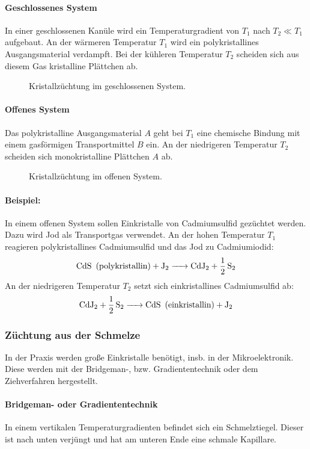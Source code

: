 \paragraph{Geschlossenes System}
    In einer geschlossenen Kanüle wird ein Temperaturgradient von $T_1$ nach $T_2 \ll T_1$ aufgebaut.
    An der wärmeren Temperatur $T_1$ wird ein polykristallines Ausgangsmaterial verdampft.
    Bei der kühleren Temperatur $T_2$ scheiden sich aus diesem Gas kristalline Plättchen ab.
    \begin{figure}[H]
        \centering
        \caption{Kristallzüchtung im geschlossenen System.}
        \label{fig:vl18-abbildung-4}
    \end{figure}

\paragraph{Offenes System}
    Das polykristalline Ausgangsmaterial $A$ geht bei $T_1$ eine chemische Bindung mit einem gasförmigen Transportmittel $B$ ein. 
    An der niedrigeren Temperatur $T_2$ scheiden sich monokristalline Plättchen $A$ ab.
    \begin{figure}[H]
        \centering
        \caption{Kristallzüchtung im offenen System.}
        \label{fig:vl18-abbildung-5}
    \end{figure}
\paragraph{Beispiel:} In einem offenen System sollen Einkristalle von Cadmiumsulfid  gezüchtet werden.
    Dazu wird Jod  als Transportgas verwendet.
    An der hohen Temperatur $T_1$ reagieren polykristallines Cadmiumsulfid und das Jod zu Cadmiumiodid:
    $$
        \ce{CdS \text{ (polykristallin)} + J2 -> CdJ2 + \frac{1}{2} S2}
    $$
    An der niedrigeren Temperatur $T_2$ setzt sich einkristallines Cadmiumsulfid ab:
    $$ 
        \ce{CdJ2 + \frac{1}{2} S2 -> CdS \text{ (einkristallin)} + J2}
    $$ 

\subsubsection{Züchtung aus der Schmelze}
    In der Praxis werden große Einkristalle benötigt, insb. in der Mikroelektronik. Diese werden mit der Bridgeman-, bzw. Gradiententechnik oder dem Ziehverfahren hergestellt.
\paragraph{Bridgeman- oder Gradiententechnik}
    In einem vertikalen Temperaturgradienten befindet sich ein Schmelztiegel.
    Dieser ist nach unten verjüngt und hat am unteren Ende eine schmale Kapillare.

